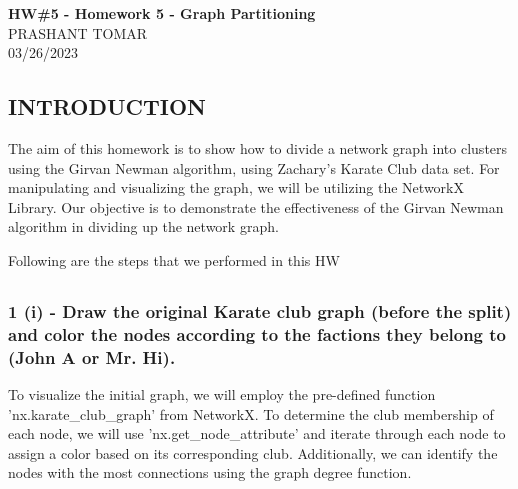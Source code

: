 \documentclass[12pt]{article}
\begin{document}
\begin{centering}
{\large\textbf{HW\#5 - Homework 5 - Graph Partitioning }}\\ %
PRASHANT TOMAR\\                     %
03/26/2023\\                      %
\end{centering}


\begin{centering}
\section*{}
\end{centering}

\subsection*{INTRODUCTION}
The aim of this homework is to show how to divide a network graph into clusters using the Girvan Newman algorithm, using Zachary's Karate Club data set. For manipulating and visualizing the graph, we will be utilizing the NetworkX Library. Our objective is to demonstrate the effectiveness of the Girvan Newman algorithm in dividing up the network graph.

Following are the steps that we performed in this HW

\subsection*{}

\subsubsection*{1 (i) - Draw the original Karate club graph (before the split) and color the nodes according to the factions they belong to (John A or Mr. Hi).}

To visualize the initial graph, we will employ the pre-defined function 'nx.karate\_club\_graph' from NetworkX. To determine the club membership of each node, we will use 'nx.get\_node\_attribute' and iterate through each node to assign a color based on its corresponding club. Additionally, we can identify the nodes with the most connections using the graph degree function. 
\end{document}

